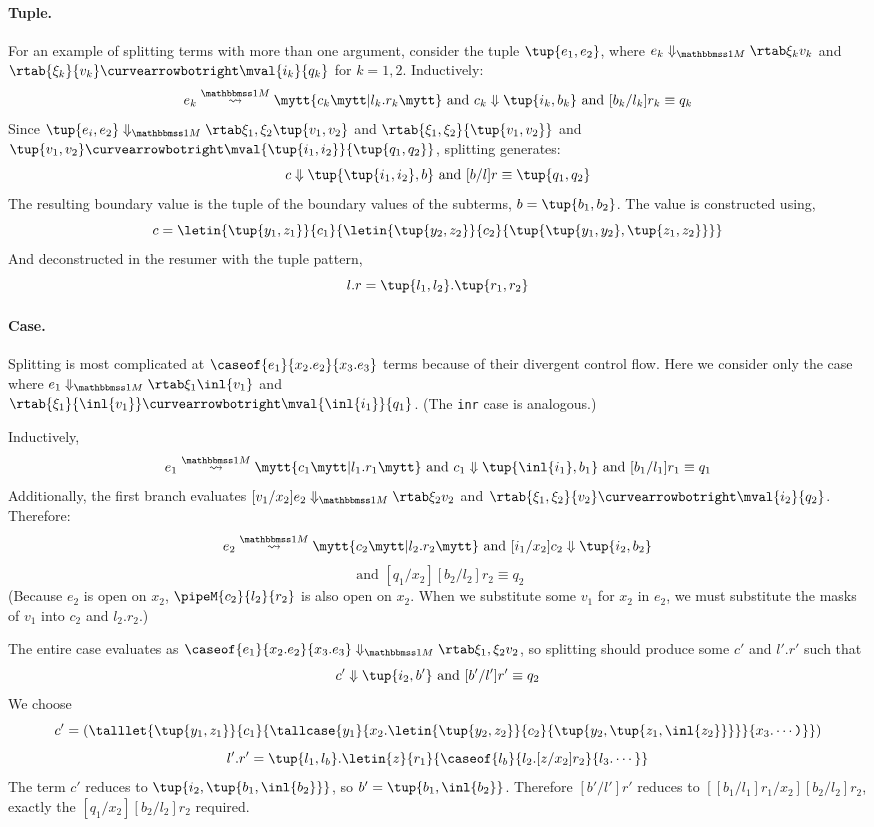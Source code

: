 \begin{abstrsyn}
\paragraph{Tuple.} For an example of splitting terms with more than one argument, consider the tuple $\tup{e_1,e_2}$,
where $\diaone {e_k} {\xi_k} {v_k}$ and 
$\rtab {\xi_k} {v_k} \vsplito \mval {i_k} {q_k}$ for $k = 1,2$.  
Inductively:
\[
	\splitone {e_k} A {c_k} {l_k.r_k} \text{ and } \reduce {c_k} {\tup{i_k,b_k}} \text{ and } [b_k/l_k]r_k \equiv q_k
\]
Since $\diaone {\tup{e_i,e_2}} {\xi_1,\xi_2} {\tup{v_1,v_2}}$ 
and $\rtab {\xi_1,\xi_2} {\tup{v_1,v_2}}$ and $\tup{v_1,v_2} \vsplito \mval {\tup{i_1,i_2}} {\tup{q_1,q_2}}$,
splitting generates:
\[
	\reduce {c} {\tup{\tup{i_1,i_2},b}} \text{ and } [b/l]r \equiv \tup{q_1,q_2}
\]
The resulting boundary value is the tuple of the boundary values of
the subterms, $b = \tup{b_1,b_2}$.  The value is 
constructed using,
\[
c = \letin{\tup{y_1,z_1}}{c_1}{\letin{\tup{y_2,z_2}}{c_2}{\tup{\tup{y_1, y_2},\tup{z_1, z_2}}}}
\]
And deconstructed in the resumer with the tuple pattern,
\[
l.r = \tup{l_1,l_2}.\tup{r_1,r_2}
\]
\paragraph {Case.}
Splitting is most complicated at $\caseof {e_1} {x_2.e_2} {x_3.e_3}$ terms because of their divergent control flow.
Here we consider only the case where
$\diaone {e_1} {\xi_1} {\inl {v_1}}$ and \\ $\rtab {\xi_1} {\inl {v_1}} \vsplito \mval {\inl {i_1}} {q_1}$.
(The \texttt{inr} case is analogous.)

\noindent
Inductively,
\[
	\splitone {e_1} A {c_1} {l_1.r_1} \text{ and } \reduce {c_1} {\tup{\inl {i_1},b_1}} \text{ and } [b_1/l_1]r_1 \equiv q_1
\]
Additionally, the first branch evaluates $\diaone {[v_1/x_2]e_2} {\xi_2} {v_2}$
and $\rtab {\xi_1,\xi_2} {v_2} \vsplito \mval {i_2} {q_2}$.
Therefore:
\[
	\splitone {e_2} A {c_2} {l_2.r_2} \text{ and } \reduce {[i_1/x_2]c_2} {\tup{i_2,b_2}} 
\]
\[
\text{ and } [q_1/x_2][b_2/l_2]r_2 \equiv q_2
\]
(Because $e_2$ is open on $x_2$, $\pipeM{c_2}{l_2}{r_2}$ is also open on $x_2$.
When we substitute some $v_1$ for $x_2$ in $e_2$, we must substitute the masks
of $v_1$ into $c_2$ and $l_2.r_2$.)

The entire case evaluates as
$\diaone {\caseof {e_1} {x_2.e_2} {x_3.e_3}} {\xi_1,\xi_2} {v_2}$, so splitting should produce 
some $c'$ and
$l'.r'$ such that 
\[
  \reduce {c'} {\tup{i_2,b'}} \text{ and }
  [b'/l']r' \equiv q_2
\]
We choose
\[
c' =
{\left(
\talllet{\tup{y_1,z_1}}{c_1}{
\tallcase{y_1}
{x_2.\letin{\tup{y_2,z_2}}{c_2}{\tup{y_2,\tup{z_1,\inl{z_2}}}}}
{x_3.\cdots\ttrpar}
}\right)}
\]
\[
l'.r' =
\tup{l_1,l_b}.\letin{z}{r_1}{\caseof{l_b}{l_2.[z/x_2]{r_2}}{l_3.\cdots}}
\]
The term $c'$ reduces to
$\tup{i_2,\tup{b_1,\inl{b_2}}}$, so 
$b' = \tup{b_1,\inl{b_2}}$. Therefore
$[b'/l']r'$ reduces to
$[[b_1/l_1]r_1/x_2][b_2/l_2]r_2$, exactly the 
$[q_1/x_2][b_2/l_2]r_2$ required.


\end{abstrsyn}
